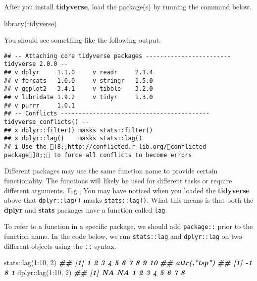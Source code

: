 \documentclass[
]{book}
\newenvironment{Shaded}{\begin{snugshade}}{\end{snugshade}}
\newcommand{\DecValTok}[1]{\textcolor[rgb]{0.00,0.00,0.81}{#1}}
\newcommand{\DocumentationTok}[1]{\textcolor[rgb]{0.56,0.35,0.01}{\textbf{\textit{#1}}}}
\newcommand{\FunctionTok}[1]{\textcolor[rgb]{0.00,0.00,0.00}{#1}}
\newcommand{\NormalTok}[1]{#1}
\newcommand{\SpecialCharTok}[1]{\textcolor[rgb]{0.00,0.00,0.00}{#1}}
\theoremstyle{definition}
\theoremstyle{definition}
\theoremstyle{definition}
\theoremstyle{definition}
\theoremstyle{remark}
\begin{document}
\begin{yourturn}
After you install \textbf{tidyverse}, load the package(s) by running the command below.

\begin{Shaded}
\begin{Highlighting}[]
\FunctionTok{library}\NormalTok{(tidyverse)}
\end{Highlighting}
\end{Shaded}

You should see something like the following output:

\begin{verbatim}
## -- Attaching core tidyverse packages ------------------------ tidyverse 2.0.0 --
## v dplyr     1.1.0     v readr     2.1.4
## v forcats   1.0.0     v stringr   1.5.0
## v ggplot2   3.4.1     v tibble    3.2.0
## v lubridate 1.9.2     v tidyr     1.3.0
## v purrr     1.0.1     
## -- Conflicts ------------------------------------------ tidyverse_conflicts() --
## x dplyr::filter() masks stats::filter()
## x dplyr::lag()    masks stats::lag()
## i Use the ]8;;http://conflicted.r-lib.org/conflicted package]8;; to force all conflicts to become errors
\end{verbatim}

\end{yourturn}

Different packages may use the same function name to provide certain functionality. The functions will likely be used for different tasks or require different arguments. E.g., You may have noticed when you loaded the \textbf{tidyverse} above that \texttt{dplyr::lag()} masks \texttt{stats::lag()}. What this means is that both the \textbf{dplyr} and \textbf{stats} packages have a function called \texttt{lag}.

To refer to a function in a specific package, we should add \texttt{package::} prior to the function name. In the code below, we run \texttt{stats::lag} and \texttt{dplyr::lag} on two different objects using the \texttt{::} syntax.

\begin{Shaded}
\begin{Highlighting}[]
\NormalTok{stats}\SpecialCharTok{::}\FunctionTok{lag}\NormalTok{(}\DecValTok{1}\SpecialCharTok{:}\DecValTok{10}\NormalTok{, }\DecValTok{2}\NormalTok{)}
\DocumentationTok{\#\#  [1]  1  2  3  4  5  6  7  8  9 10}
\DocumentationTok{\#\# attr(,"tsp")}
\DocumentationTok{\#\# [1] {-}1  8  1}
\NormalTok{dplyr}\SpecialCharTok{::}\FunctionTok{lag}\NormalTok{(}\DecValTok{1}\SpecialCharTok{:}\DecValTok{10}\NormalTok{, }\DecValTok{2}\NormalTok{)}
\DocumentationTok{\#\#  [1] NA NA  1  2  3  4  5  6  7  8}
\end{Highlighting}
\end{Shaded}
\end{document}
